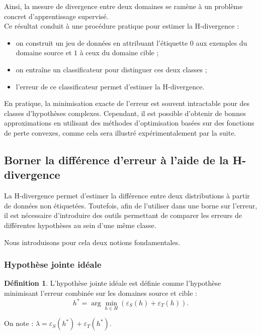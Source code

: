 \documentclass[a4paper,12pt]{article}
\theoremstyle{definition}
\newtheorem{definition}{Définition}[section]
\theoremstyle{remark}
\begin{document}
Ainsi, la mesure de divergence entre deux domaines se ramène à un problème concret d’apprentissage supervisé.\\




Ce résultat conduit à une procédure pratique pour estimer la H-divergence :

\begin{itemize}
\item on construit un jeu de données en attribuant l’étiquette $0$ aux exemples du domaine source et $1$ à ceux du domaine cible ;
\item on entraîne un classificateur pour distinguer ces deux classes ;
\item l’erreur de ce classificateur permet d’estimer la H-divergence.
\end{itemize}

En pratique, la minimisation exacte de l’erreur est souvent intractable pour des classes d’hypothèses complexes. Cependant, il est possible d’obtenir de bonnes approximations en utilisant des méthodes d’optimisation basées sur des fonctions de perte convexes, comme cela sera illustré expérimentalement par la suite.\\



\subsection{Borner la différence d’erreur à l’aide de la H-divergence}

La H-divergence permet d’estimer la différence entre deux distributions à partir de données non étiquetées. Toutefois, afin de l’utiliser dans une borne sur l’erreur, il est nécessaire d’introduire des outils permettant de comparer les erreurs de différentes hypothèses au sein d’une même classe.

Nous introduisons pour cela deux notions fondamentales.

\subsubsection{Hypothèse jointe idéale}

\begin{definition}
L’hypothèse jointe idéale est définie comme l’hypothèse minimisant l’erreur combinée
sur les domaines source et cible :
\[
h^*
=
\arg\min_{h\in H}
\left(
\varepsilon_S(h)+\varepsilon_T(h)
\right).
\]

On note : $\lambda = \varepsilon_S(h^*) + \varepsilon_T(h^*)$.\\
\end{definition}
\end{document}
